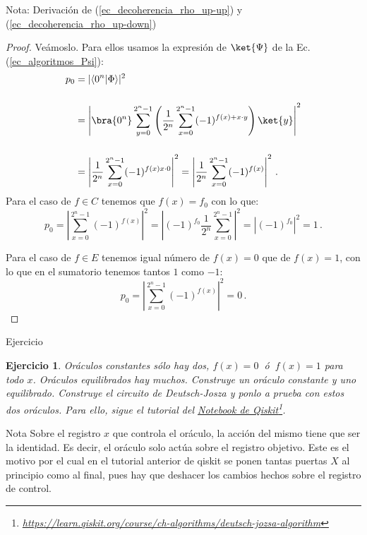 \documentclass[a4paper,11pt]{book} %
\newtheorem{ejercicio_contador}{Ejercicio}
\newcommand{\Ejercicio}[1]{
		\begin{mybox_gray}{Ejercicio} 
			\begin{ejercicio_contador}
				 #1 
			\end{ejercicio_contador} 
		\end{mybox_gray}
	}
\numberwithin{equation}{chapter}
\newcommand{\braket}[2]{\langle #1|#2\rangle}
\begin{document}
\begin{mybox_blue}{Nota: Derivación de (\ref{ec_decoherencia_rho_up-up}) y  (\ref{ec_decoherencia_rho_up-down})}
\begin{itemize}
\end{itemize}

	\begin{proof}
	Veámoslo. Para ellos usamos la expresión de $\ket{\Psi}$ de la Ec. (\ref{ec_algoritmos_Psi}):
	\begin{align*}
	p_{0} &= |\braket{0^n}{\Phi}|^2 \nonumber\\ \rule{0mm}{12mm}
		  &= \left| \bra{0^n} \sum_{y=0}^{2^n-1} \left( \frac{1}{2^n}\sum_{x=0}^{2^n-1}(-1)^{f(x) + x \cdot y} \right)\ket{y} \right|^2 \\ \rule{0mm}{12mm}
	      &= \left| \frac{1}{2^n} \sum_{x=0}^{2^n-1} (-1)^{f(x) x \cdot 0} \right|^2   =  \left| \frac{1}{2^n} \sum_{x=0}^{2^n-1} (-1)^{f(x)} \right|^2 \, .
	\end{align*}
	Para el caso de $f \in C$ tenemos que $f(x) = f_0$ con lo que:
	\begin{equation*}
	p_{0} = \left|  \sum_{x=0}^{2^n-1} (-1)^{f(x)} \right|^2    =  \left| (-1)^{f_0} \frac{1}{2^n} \sum_{x=0}^{2^n-1}  \right|^2  = \left| (-1)^{f_0} \right|^2 = 1  \, .
	\end{equation*}
	
	Para el caso de $f \in E$ tenemos igual número de  $f(x) = 0$ que de $f(x) = 1$, con lo que en el sumatorio tenemos tantos $1$ como $-1$:
	\begin{equation*}
	p_{0} = \left|  \sum_{x=0}^{2^n-1} (-1)^{f(x)} \right|^2    =  0  \, .
	\end{equation*}
	\end{proof}



	\Ejercicio{Oráculos constantes sólo hay dos, $f(x)=0~$ ó $~f(x) = 1$ para todo $x$. Oráculos equilibrados hay muchos. Construye un oráculo constante y uno
	equilibrado. Construye el circuito de Deutsch-Josza y ponlo a prueba con estos dos oráculos. Para ello, sigue el tutorial del 
	\href{https://learn.qiskit.org/course/ch-algorithms/deutsch-jozsa-algorithm}{Notebook de Qiskit}\footnote{\url{https://learn.qiskit.org/course/ch-algorithms/deutsch-jozsa-algorithm}}. }

	\begin{mybox_blue}{Nota}
	Sobre el registro $x$ que controla el oráculo, la acción del mismo tiene que ser la identidad. Es decir, el oráculo solo actúa sobre el registro objetivo. Este es el motivo por el cual en el 
	tutorial anterior de qiskit se ponen tantas puertas $X$ al principio como al final, pues hay que deshacer los cambios hechos sobre el registro de control.
	\end{mybox_blue}


\end{mybox_blue}
\end{document}
